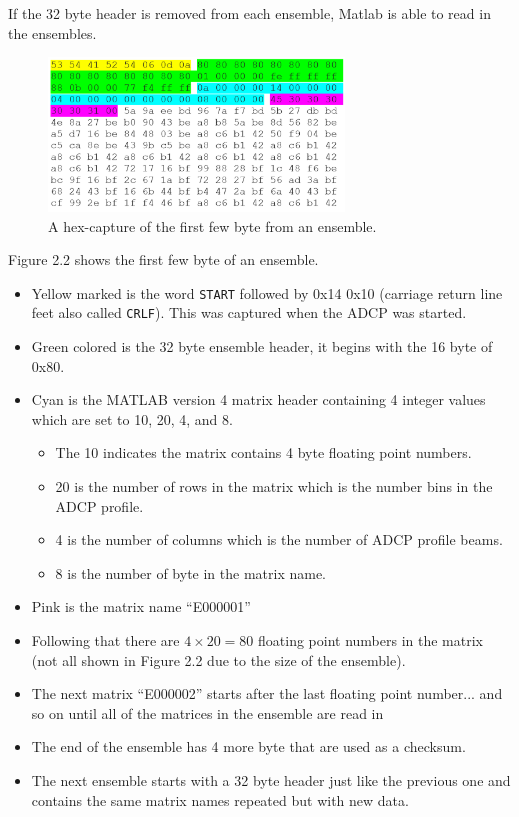 If the 32 byte header is removed from each ensemble, Matlab is able to read in the ensembles.
\begin{figure}[h]
\centering
      \includegraphics[width=0.7\textwidth]{hexdump}
        \caption{A hex-capture of the first few byte from an ensemble.}
\end{figure}
Figure 2.2 shows the first few byte of an ensemble.
\begin{itemize}
\item Yellow marked is the word \texttt{START} followed by 0x14 0x10 (carriage return line feet also called \texttt{CRLF}). This was captured when the ADCP was started.
\item Green colored is the 32 byte ensemble header, it begins with the 16 byte of 0x80.
\item Cyan is the MATLAB version 4 matrix header containing 4 integer values which are set to 10, 20, 4, and 8.  
\begin{itemize}
\item The 10 indicates the matrix contains 4 byte floating point numbers. 
\item 20 is the number of rows in the matrix which is the number bins in the ADCP profile. 
\item 4 is the number of columns which is the number of ADCP profile beams.  
\item 8 is the number of byte in the matrix name.  
\end{itemize}
\item Pink is the matrix name ``E000001''
\item Following that there are $4 \times 20 = 80$  floating point numbers in the matrix (not all shown in Figure 2.2 due to the size of the ensemble).
\item The next matrix ``E000002'' starts after the last floating point number... and so on until all of the matrices in the ensemble are read in
\item The end of the ensemble has 4 more byte that are used as a checksum. 
\item The next ensemble starts with a 32 byte header just like the previous one and contains the same matrix names repeated but with new data. 
\end{itemize}

